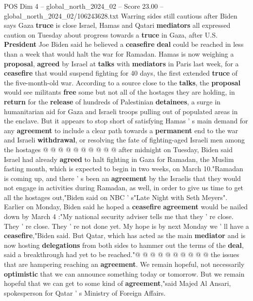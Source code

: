 \begin{textsample}{POS Dim 4 – global\_north\_2024\_02 – Score 23.00 – global\_north\_2024\_02/106243628.txt}  \label{ex:f4_pos_179}
Warring sides still cautious after Biden says Gaza \textbf{truce} is close Israel, Hamas and Qatari \textbf{mediators} all expressed caution on Tuesday about progress towards a \textbf{truce} in Gaza, after U.S. \textbf{President} Joe Biden said he believed a \textbf{ceasefire} \textbf{deal} could be reached in less than a week that would halt the war for Ramadan.
Hamas is now weighing a \textbf{proposal}, \textbf{agreed} by Israel at \textbf{talks} with \textbf{mediators} in Paris last week, for a \textbf{ceasefire} that would suspend fighting for 40 days, the first extended \textbf{truce} of the five-month-old war.
According to a source close to the \textbf{talks}, the \textbf{proposal} would see militants \textbf{free} some but not all of the hostages they are holding, in \textbf{return} for the \textbf{release} of hundreds of Palestinian \textbf{detainees}, a surge in humanitarian aid for Gaza and Israeli troops pulling out of populated areas in the enclave.
But it appears to stop short of satisfying Hamas ' s main demand for any \textbf{agreement} to include a clear path towards a \textbf{permanent} end to the war and Israeli \textbf{withdrawal}, or resolving the fate of fighting-aged Israeli men among the hostages @ @ @ @ @ @ @ @ @ @ after midnight on Tuesday, Biden said Israel had already \textbf{agreed} to halt fighting in Gaza for Ramadan, the Muslim fasting month, which is expected to begin in two weeks, on March 10."Ramadan is coming up, and there ' s been an \textbf{agreement} by the Israelis that they would not engage in activities during Ramadan, as well, in order to give us time to get all the hostages out,"Biden said on NBC ' s"Late Night with Seth Meyers".
Earlier on Monday, Biden said he hoped a \textbf{ceasefire} \textbf{agreement} would be nailed down by March 4 :"My national security adviser tells me that they ' re close.
They ' re close.
They ' re not done yet.
My hope is by next Monday we ' ll have a \textbf{ceasefire},"Biden said.
But Qatar, which has acted as the main \textbf{mediator} and is now hosting \textbf{delegations} from both sides to hammer out the terms of the \textbf{deal}, said a breakthrough had yet to be reached."@ @ @ @ @ @ @ @ @ @ the issues that are hampering reaching an \textbf{agreement}.
We remain hopeful, not necessarily \textbf{optimistic} that we can announce something today or tomorrow.
But we remain hopeful that we can get to some kind of \textbf{agreement},"said Majed Al Ansari, spokesperson for Qatar ' s Ministry of Foreign Affairs.

\end{textsample}
